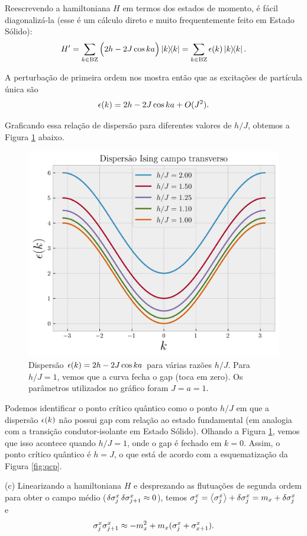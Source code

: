 \documentclass[a4paper,10pt]{article}
\begin{document}
\n

Reescrevendo a hamiltoniana $H$ em termos dos estados de momento, é fácil diagonalizá-la (esse é um cálculo direto e muito frequentemente feito em Estado Sólido):
$$
H' =
\sum_{k \in \text{BZ}}
\Big(2h - 2J \cos ka\Big) \dyad{k} =
\sum_{k \in \text{BZ}}
\eps(k) \dyad{k}.
$$

\n

A perturbação de primeira ordem nos mostra então que as excitações de partícula única são
$$
\epsilon(k) = 2h - 2J \cos ka + O(J^2).
$$

\n

Graficando essa relação de dispersão para diferentes valores de $h/J$, obtemos a Figura \ref{fig:transv_ising} abaixo.
\begin{figure}[H]
\centering
\includegraphics[width=0.8\linewidth]{fig/transv_ising.png}
\caption{Dispersão $\epsilon(k) = 2h - 2J \cos ka$ para várias razões $h/J$. Para $h/J = 1$, vemos que a curva fecha o gap (toca em zero). Os parâmetros utilizados no gráfico foram $J = a = 1$.}
\label{fig:transv_ising}
\end{figure}

\n

Podemos identificar o ponto crítico quântico como o ponto $h/J$ em que a dispersão $\epsilon(k)$ não possui gap com relação ao estado fundamental (em analogia com a transição condutor-isolante em Estado Sólido). Olhando a Figura \ref{fig:transv_ising}, vemos que isso acontece quando $h/J = 1$, onde o gap é fechado em $k = 0$. Assim, o ponto crítico quântico é $h = J$, o que está de acordo com a esquematização da Figura \ref{fig:qcp}.

\n\n

(c) Linearizando a hamiltoniana $H$ e desprezando as flutuações de segunda ordem para obter o campo médio ($\delta \sigma_j^x \, \delta \sigma_{j+1}^x \approx 0$), temos $\s_j^x = \ev{\s_j^x} + \delta \s_j^x = m_x + \delta \s_j^x$ e
$$
\sigma_j^x \sigma_{j+1}^x \approx -m_x^2 + m_x (\sigma_j^x + \sigma_{x+1}^x).
$$
\end{document}
